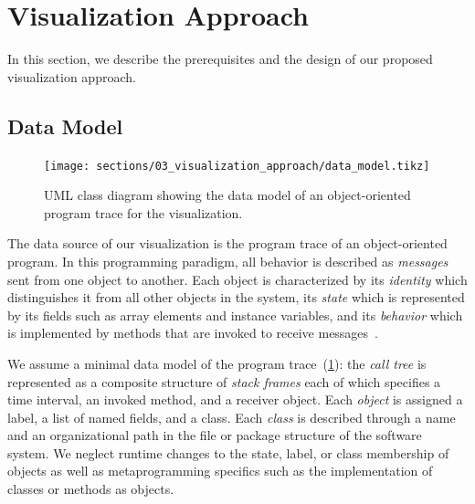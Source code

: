 \section{Visualization Approach}
\label{sec:visualization_approach}

In this section, we describe the prerequisites and the design of our proposed visualization approach.

\subsection{Data Model}
\label{sec:visualization_approach/data_model}

\begin{figure}
	\texttt{[image: sections/03\_visualization\_approach/data\_model.tikz]}
	\caption{UML class diagram showing the data model of an object-oriented program trace for the visualization.}
	\label{fig:visualization_approach/data_model}
\end{figure}

The data source of our visualization is the program trace of an object-oriented program.
In this programming paradigm, all behavior is described as \emph{messages} sent from one object to another.
Each object is characterized by its \emph{identity} which distinguishes it from all other objects in the system, its \emph{state} which is represented by its fields such as array elements and instance variables, and its \emph{behavior} which is implemented by methods that are invoked to receive messages~\cite{thiede2023time}.

We assume a minimal data model of the program trace~(\cref{fig:visualization_approach/data_model}):
the \emph{call tree} is represented as a composite structure of \emph{stack frames} each of which specifies a time interval, an invoked method, and a receiver object.
Each \emph{object} is assigned a label, a list of named fields, and a class.
Each \emph{class} is described through a name and an organizational path in the file or package structure of the software system.
We neglect runtime changes to the state, label, or class membership of objects as well as metaprogramming specifics such as the implementation of classes or methods as objects.

